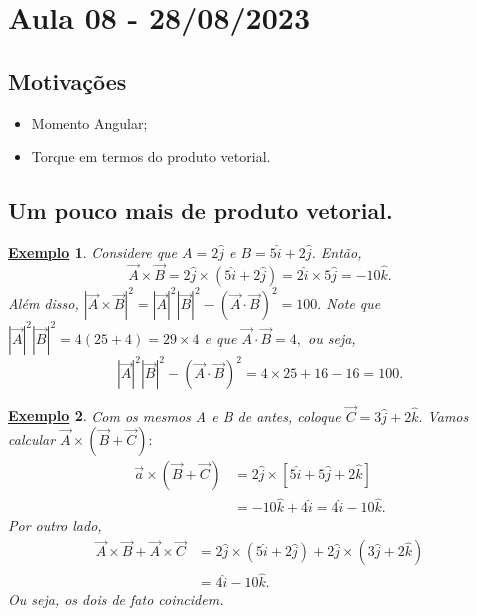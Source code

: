 \documentclass{article}
\newtheorem{example}{\underline{Exemplo}}
\begin{document}
\section{Aula 08 - 28/08/2023}
\subsection{Motivações}
\begin{itemize}
  \item Momento Angular;
  \item Torque em termos do produto vetorial.
\end{itemize}
\subsection{Um pouco mais de produto vetorial.}
 \begin{example}
  Considere que \(A = 2 \hat{j}\) e \(B = 5\hat{i} + 2 \hat{j}\). Então, 
     \[
       \vec{A} \times{\vec{B}} = 2\hat{j} \times (5\hat{i} + 2\hat{j}) = 2\hat{i}\times 5\hat{j} = -10\hat{k}.
     \]
  Além disso, \(|\vec{A}\times \vec{B}|^{2} = |\vec{A}|^{2}|\vec{B}|^{2} - (\vec{A}\cdot \vec{B})^{2} = 100.\) Note que 
 \(|\vec{A}|^{2}|\vec{B}|^{2} = 4 (25+4) = 29\times 4\) e que \(\vec{A}\cdot \vec{B} = 4, \) ou seja, 
   \[
     |\vec{A}|^{2}|\vec{B}|^{2} - (\vec{A}\cdot \vec{B})^{2} = 4\times 25 + 16 - 16 = 100.
   \]
 \end{example}
 \begin{example}
   Com os mesmos A e B de antes, coloque \(\vec{C} = 3\hat{j} + 2 \hat{k}.\) Vamos calcular \(\vec{A}\times(\vec{B} + \vec{C}):\)
  \begin{align*}
    \vec{a}\times(\vec{B}+\vec{C}) &= 2\hat{j} \times [5\hat{i} + 5\hat{j} + 2\hat{k}]\\
                                   &= - 10\hat{k} + 4\hat{i} = 4\hat{i} - 10\hat{k}.
  \end{align*}
  Por outro lado, 
 \begin{align*}
   \vec{A} \times \vec{B} + \vec{A} \times \vec{C} &= 2\hat{j}\times(5\hat{i} + 2\hat{j}) + 2\hat{j}\times(3\hat{j}+2\hat{k})\\
                                                   &= 4\hat{i} - 10\hat{k}.
 \end{align*}
 Ou seja, os dois de fato coincidem.
 \end{example}
\end{document}
